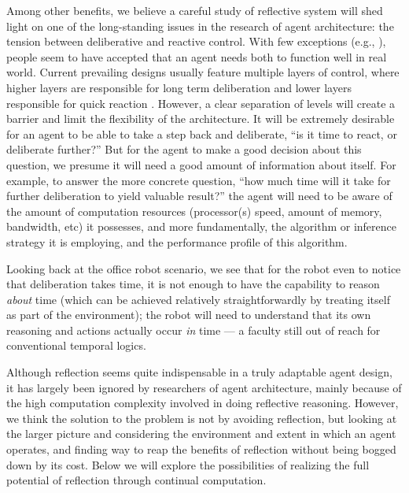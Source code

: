 \documentclass{llncs}
\begin{document}
Among other benefits, we believe a careful study of reflective system will
shed light on one of the long-standing issues in the research of agent
architecture: the tension between deliberative and reactive control.  With
few exceptions (e.g., \cite{brooks1991:intelligence_without}), people seem
to have accepted that an agent needs both to function well in real world.
Current prevailing designs usually feature multiple layers of control,
where higher layers are responsible for long term deliberation and lower
layers responsible for quick reaction
\cite{lesperance1994:logical_approach,bonasso1996:using_layered}.  However,
a clear separation of levels will create a barrier and limit the
flexibility of the architecture.  It will be extremely desirable for an
agent to be able to take a step back and deliberate, ``is it time to react,
or deliberate further?''  But for the agent to make a good decision about
this question, we presume it will need a good amount of information about
itself.  For example, to answer the more concrete question, ``how much time
will it take for further deliberation to yield valuable result?'' the agent
will need to be aware of the amount of computation resources (processor(s)
speed, amount of memory, bandwidth, etc) it possesses, and more
fundamentally, the algorithm or inference strategy it is employing, and the
performance profile of this algorithm.

Looking back at the office robot scenario, we see that for the robot even
to notice that deliberation takes time, it is not enough to have the
capability to reason \emph{about} time (which can be achieved relatively
straightforwardly by treating itself as part of the environment); the robot
will need to understand that its own reasoning and actions actually occur
\emph{in} time --- a faculty still out of reach for conventional temporal
logics.

%

Although reflection seems quite indispensable in a truly adaptable agent
design, it has largely been ignored by researchers of agent architecture,
mainly because of the high computation complexity involved in doing
reflective reasoning.  However, we think the solution to the problem is not
by avoiding reflection, but looking at the larger picture and considering
the environment and extent in which an agent operates, and finding way to
reap the benefits of reflection without being bogged down by its cost.
Below we will explore the possibilities of realizing the full potential of
reflection through continual computation.
\end{document}
